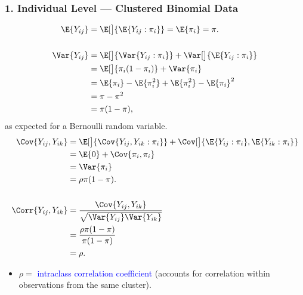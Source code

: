 \documentclass[oneside]{book}\usepackage[]{graphicx}\usepackage[svgnames]{xcolor}
\providecommand\given{} %
\renewcommand\given{\nonscript\:\delimsize\vert\nonscript\:\mathopen{}}%
\renewcommand\given{\nonscript\:\delimsize\vert\nonscript\:\mathopen{}}%
\renewcommand\given{\nonscript\:\delimsize\vert\nonscript\:\mathopen{}}%
\renewcommand\given{\nonscript\:\delimsize\vert\nonscript\:\mathopen{}}%
\renewcommand\given{\nonscript\:\delimsize\vert\nonscript\:\mathopen{}}%
\renewcommand\given{\nonscript\:\delimsize\vert\nonscript\:\mathopen{}}%
\renewcommand\given{\nonscript\:\delimsize\vert\nonscript\:\mathopen{}}%
\renewcommand\given{\nonscript\:\delimsize\vert\nonscript\:\mathopen{}}%
\renewcommand\given{\nonscript\:\delimsize\vert\nonscript\:\mathopen{}}%
\renewcommand\given{\nonscript\:\delimsize\vert\nonscript\:\mathopen{}}%
\renewcommand\given{\nonscript\:\delimsize\vert\nonscript\:\mathopen{}}%
\renewcommand\given{\nonscript\:\delimsize\vert\nonscript\:\mathopen{}}%
\renewcommand\given{:}
\begin{document}
\subsubsection*{1. Individual Level --- Clustered Binomial Data}
\begin{align*}
    \E{Y_{ij}}   & = \E[\big]{\E{Y_{ij}\given \pi_i}}=\E{\pi_i}=\pi.                      \\\\
    \Var{Y_{ij}} & =\E[\big]{\Var{Y_{ij}\given \pi_i}}+\Var[\big]{\E{Y_{ij}\given \pi_i}} \\
                 & =\E[\big]{\pi_i(1-\pi_i)}+\Var{\pi_i}                                  \\
                 & =\E{\pi_i}-\E{\pi_i^2}+\E{\pi_i^2}-\E{\pi_i}^2                         \\
                 & =\pi-\pi^2                                                             \\
                 & =\pi(1-\pi),
\end{align*}
as expected for a Bernoulli random variable.
\begin{align*}
    \Cov{Y_{ij},Y_{ik}}
     & =\E[\big]{\Cov{Y_{ij},Y_{ik}\given \pi_i}}+\Cov[\big]{\E{Y_{ij}\given \pi_i},\E{Y_{ik}\given \pi_i}} \\
     & =\E{0}+\Cov{\pi_i,\pi_i}                                                                             \\
     & =\Var{\pi_i}                                                                                         \\
     & =\rho\pi(1-\pi).                                                                                     \\\\
    \Corr{Y_{ij},Y_{ik}}
     & =\frac{\Cov{Y_{ij},Y_{ik}}}{\sqrt{\Var{Y_{ij}}\Var{Y_{ik}}}}                                         \\
     & =\frac{\rho\pi(1-\pi)}{\pi(1-\pi)}                                                                   \\
     & =\rho.
\end{align*}
\begin{itemize}
    \item $ \rho= $ \textcolor{Blue}{intraclass correlation coefficient} (accounts for correlation within observations
          from the same cluster).
\end{itemize}
\end{document}
